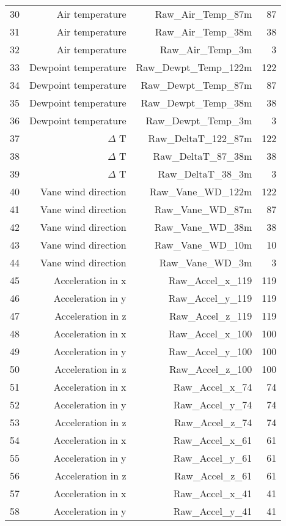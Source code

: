 \begin{longtable}{lrrr}
30 & Air temperature & Raw\_Air\_Temp\_87m & 87\\
31 & Air temperature & Raw\_Air\_Temp\_38m & 38\\
32 & Air temperature & Raw\_Air\_Temp\_3m & 3\\
33 & Dewpoint temperature & Raw\_Dewpt\_Temp\_122m & 122\\
34 & Dewpoint temperature & Raw\_Dewpt\_Temp\_87m & 87\\
35 & Dewpoint temperature & Raw\_Dewpt\_Temp\_38m & 38\\
36 & Dewpoint temperature & Raw\_Dewpt\_Temp\_3m & 3\\
37 & $\Delta$ T & Raw\_DeltaT\_122\_87m & 122\\
38 & $\Delta$ T & Raw\_DeltaT\_87\_38m & 38\\
39 & $\Delta$ T & Raw\_DeltaT\_38\_3m & 3\\
40 & Vane wind direction & Raw\_Vane\_WD\_122m & 122\\
41 & Vane wind direction & Raw\_Vane\_WD\_87m & 87\\
42 & Vane wind direction & Raw\_Vane\_WD\_38m & 38\\
43 & Vane wind direction & Raw\_Vane\_WD\_10m & 10\\
44 & Vane wind direction & Raw\_Vane\_WD\_3m & 3\\
45 & Acceleration in x & Raw\_Accel\_x\_119 & 119\\
46 & Acceleration in y & Raw\_Accel\_y\_119 & 119\\
47 & Acceleration in z & Raw\_Accel\_z\_119 & 119\\
48 & Acceleration in x & Raw\_Accel\_x\_100 & 100\\
49 & Acceleration in y & Raw\_Accel\_y\_100 & 100\\
50 & Acceleration in z & Raw\_Accel\_z\_100 & 100\\
51 & Acceleration in x & Raw\_Accel\_x\_74 & 74\\
52 & Acceleration in y & Raw\_Accel\_y\_74 & 74\\
53 & Acceleration in z & Raw\_Accel\_z\_74 & 74\\
54 & Acceleration in x & Raw\_Accel\_x\_61 & 61\\
55 & Acceleration in y & Raw\_Accel\_y\_61 & 61\\
56 & Acceleration in z & Raw\_Accel\_z\_61 & 61\\
57 & Acceleration in x & Raw\_Accel\_x\_41 & 41\\
58 & Acceleration in y & Raw\_Accel\_y\_41 & 41\\

\end{longtable}
